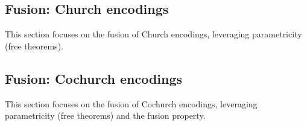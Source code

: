 \subsection{Fusion: Church encodings}
This section focuses on the fusion of Church encodings, leveraging parametricity (free theorems).
\pagebreak






\subsection{Fusion: Cochurch encodings}
This section focuses on the fusion of Cochurch encodings, leveraging parametricity (free theorems) and the fusion property.


